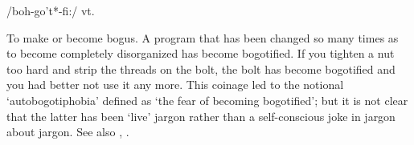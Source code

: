  /boh-go't*-fi:/ vt.

To make or become bogus. A program that has been changed so many times as to
become completely disorganized has become bogotified. If you tighten a nut too
hard and strip the threads on the bolt, the bolt has become bogotified and you
had better not use it any more. This coinage led to the notional
`autobogotiphobia' defined as `the fear of becoming bogotified'; but it is not
clear that the latter has been `live' jargon rather than a self-conscious joke
in jargon about jargon. See also , .


